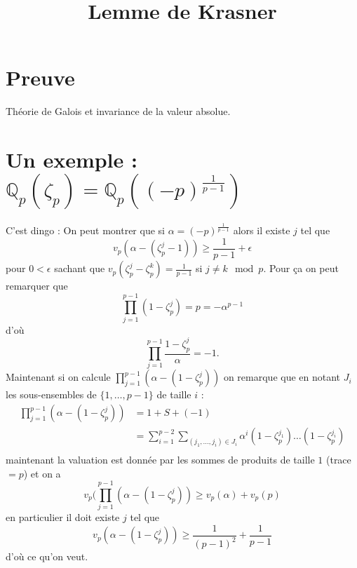 \documentclass[a4paper,12pt]{article}
\title{Lemme de Krasner}
\date{}
\newcommand{\Q}{\mathbb{Q}}
\theoremstyle{plain}
\theoremstyle{definition}
\theoremstyle{remark}
\begin{document}
\maketitle

\section{Preuve}
Théorie de Galois et invariance de la valeur absolue.

\section{Un exemple : $\Q_p(\zeta_p)=\Q_p((-p)^{\frac{1}{p-1}})$}
C'est dingo : On peut montrer que si 
$\alpha=(-p)^{\frac{1}{p-1}}$ alors il existe $j$ tel que
\[v_p(\alpha-(\zeta_p^j-1))\geq \frac{1}{p-1}+\epsilon\]
pour $0 <\epsilon$ sachant que 
$v_p(\zeta_p^j-\zeta_p^k)=\frac{1}{p-1}$ si 
$j\ne k\mod p$. Pour ça on peut remarquer que
\[\prod_{j=1}^{p-1} (1-\zeta_p^j)=p=-\alpha^{p-1}\]
d'où
\[\prod_{j=1}^{p-1} \frac{1-\zeta_p^j}{\alpha}=-1.\]
Maintenant si on calcule 
$\prod_{j=1}^{p-1}(\alpha-(1-\zeta_p^j))$ on remarque que
en notant $J_i$ les sous-ensembles de $\{1,\ldots, p-1\}$
de taille $i$ :
\begin{align*}
  \prod_{j=1}^{p-1}(\alpha-(1-\zeta_p^j))&=1+S+(-1)\\
                                        &=\sum_{i=1}^{p-2}\sum_{(j_1,\ldots,j_i)\in J_i}\alpha^i(1-\zeta_p^{j_1})\ldots(1-\zeta_p^{j_i})\\
\end{align*}
maintenant la valuation est donnée par les sommes
de produits de taille $1$ (trace$=p$) et on a
\[v_p(\prod_{j=1}^{p-1}(\alpha-(1-\zeta_p^j))\geq v_p(\alpha)+v_p(p)\]
en particulier il doit existe $j$ tel que 
\[v_p(\alpha-(1-\zeta_p^j))\geq \frac{1}{(p-1)^2}+\frac{1}{p-1}\]
d'où ce qu'on veut.
\end{document}

